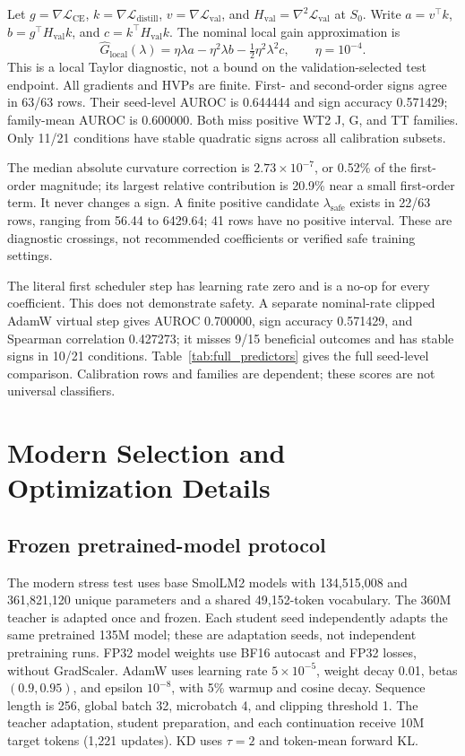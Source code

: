Let $g=\nabla\mathcal{L}_{\mathrm{CE}}$, $k=\nabla\mathcal{L}_{\mathrm{distill}}$, $v=\nabla\mathcal{L}_{\mathrm{val}}$, and $H_{\mathrm{val}}=\nabla^2\mathcal{L}_{\mathrm{val}}$ at $S_0$. Write $a=v^\top k$, $b=g^\top H_{\mathrm{val}}k$, and $c=k^\top H_{\mathrm{val}}k$. The nominal local gain approximation is
\begin{equation}
\widehat G_{\mathrm{local}}(\lambda)
=\eta\lambda a-\eta^2\lambda b-\tfrac12\eta^2\lambda^2c,
\qquad \eta=10^{-4}.
\end{equation}
This is a local Taylor diagnostic, not a bound on the validation-selected test endpoint. All gradients and HVPs are finite. First- and second-order signs agree in 63/63 rows. Their seed-level AUROC is 0.644444 and sign accuracy 0.571429; family-mean AUROC is 0.600000. Both miss positive WT2 J, G, and TT families. Only 11/21 conditions have stable quadratic signs across all calibration subsets.

The median absolute curvature correction is $2.73\times10^{-7}$, or 0.52\% of the first-order magnitude; its largest relative contribution is 20.9\% near a small first-order term. It never changes a sign. A finite positive candidate $\lambda_{\mathrm{safe}}$ exists in 22/63 rows, ranging from 56.44 to 6429.64; 41 rows have no positive interval. These are diagnostic crossings, not recommended coefficients or verified safe training settings.

The literal first scheduler step has learning rate zero and is a no-op for every coefficient. This does not demonstrate safety. A separate nominal-rate clipped AdamW virtual step gives AUROC 0.700000, sign accuracy 0.571429, and Spearman correlation 0.427273; it misses 9/15 beneficial outcomes and has stable signs in 10/21 conditions. Table~\ref{tab:full_predictors} gives the full seed-level comparison. Calibration rows and families are dependent; these scores are not universal classifiers.



\section{Modern Selection and Optimization Details}\label{app:modern}

\subsection{Frozen pretrained-model protocol}

The modern stress test uses base SmolLM2 models with 134,515,008 and 361,821,120 unique parameters and a shared 49,152-token vocabulary. The 360M teacher is adapted once and frozen. Each student seed independently adapts the same pretrained 135M model; these are adaptation seeds, not independent pretraining runs. FP32 model weights use BF16 autocast and FP32 losses, without GradScaler. AdamW uses learning rate $5\times10^{-5}$, weight decay 0.01, betas $(0.9,0.95)$, and epsilon $10^{-8}$, with 5\% warmup and cosine decay. Sequence length is 256, global batch 32, microbatch 4, and clipping threshold 1. The teacher adaptation, student preparation, and each continuation receive 10M target tokens (1,221 updates). KD uses $\tau=2$ and token-mean forward KL.

